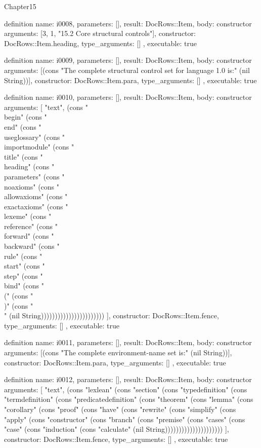 \begin{lexlean}{Chapter15}
\begin{semanticmodule}
definition{
  name: i0008,
  parameters: [],
  result: DocRows::Item,
  body: constructor{
    arguments: [3, 1, "15.2 Core structural controls"],
    constructor: DocRows::Item.heading,
    type_arguments: []
  },
  executable: true
}

definition{
  name: i0009,
  parameters: [],
  result: DocRows::Item,
  body: constructor{
    arguments: [(cons "The complete structural control set for language 1.0 is:" (nil String))],
    constructor: DocRows::Item.para,
    type_arguments: []
  },
  executable: true
}

definition{
  name: i0010,
  parameters: [],
  result: DocRows::Item,
  body: constructor{
    arguments: [
      "text",
      (cons "\\begin" (cons "\\end" (cons "\\useglossary" (cons "\\importmodule" (cons "\\title" (cons "\\heading" (cons "\\parameters" (cons "\\noaxioms" (cons "\\allowaxioms" (cons "\\exactaxioms" (cons "\\lexeme" (cons "\\reference" (cons "\\forward" (cons "\\backward" (cons "\\rule" (cons "\\start" (cons "\\step" (cons "\\bind" (cons "\\(" (cons "\\)" (cons "\\[" (cons "\\]" (nil String)))))))))))))))))))))))
    ],
    constructor: DocRows::Item.fence,
    type_arguments: []
  },
  executable: true
}

definition{
  name: i0011,
  parameters: [],
  result: DocRows::Item,
  body: constructor{
    arguments: [(cons "The complete environment-name set is:" (nil String))],
    constructor: DocRows::Item.para,
    type_arguments: []
  },
  executable: true
}

definition{
  name: i0012,
  parameters: [],
  result: DocRows::Item,
  body: constructor{
    arguments: [
      "text",
      (cons "lexlean" (cons "section" (cons "typedefinition" (cons "termdefinition" (cons "predicatedefinition" (cons "theorem" (cons "lemma" (cons "corollary" (cons "proof" (cons "have" (cons "rewrite" (cons "simplify" (cons "apply" (cons "constructor" (cons "branch" (cons "premise" (cons "cases" (cons "case" (cons "induction" (cons "calculate" (nil String)))))))))))))))))))))
    ],
    constructor: DocRows::Item.fence,
    type_arguments: []
  },
  executable: true
}


\end{semanticmodule}
\end{lexlean}
